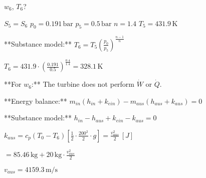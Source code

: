 \( w_6 \), \( T_6 \)?  

\( S_5 = S_6 \)  
\( p_0 = 0.191 \, \text{bar} \)  
\( p_5 = 0.5 \, \text{bar} \)  
\( n = 1.4 \)  
\( T_5 = 431.9 \, \text{K} \)  

**Substance model:**  
\( T_6 = T_5 \left( \frac{p_0}{p_5} \right)^{\frac{n-1}{n}} \)  

\( T_6 = 431.9 \cdot \left( \frac{0.191}{0.5} \right)^{\frac{0.4}{1.4}} = 328.1 \, \text{K} \)  

**For \( w_6 \):**  
The turbine does not perform \( \dot{W} \) or \( \dot{Q} \).  

**Energy balance:**  
\( m_{in} (h_{in} + k_{ein}) - m_{aus} (h_{aus} + k_{aus}) = 0 \)  

**Substance model:**  
\( h_{in} - h_{aus} + k_{ein} - k_{aus} = 0 \)  

\( k_{aus} = c_p (T_0 - T_6) \left[ \frac{1}{2} \cdot \frac{200^2}{2} \cdot g \right] = \frac{v_{aus}^2}{2} \, [J] \)  

\( = 85.46 \, \text{kg} + 20 \, \text{kg} \cdot \frac{v_{aus}^2}{2} \)  

\( v_{aus} = 4159.3 \, \text{m/s} \)